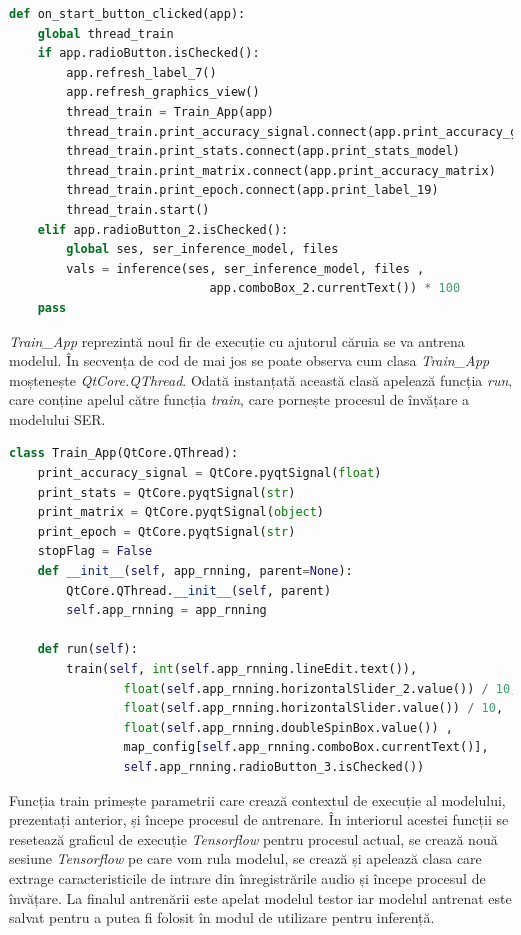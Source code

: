 \documentclass[a4paper,12pt]{book}
\begin{document}
		\begin{lstlisting}[language=Python, caption={Metoda interfetei grafice apelata automat in urma apasarii butonului Start.}, label=on_click]	
def on_start_button_clicked(app):
	global thread_train
	if app.radioButton.isChecked():
		app.refresh_label_7()
		app.refresh_graphics_view()
		thread_train = Train_App(app)
		thread_train.print_accuracy_signal.connect(app.print_accuracy_graph)
		thread_train.print_stats.connect(app.print_stats_model)
		thread_train.print_matrix.connect(app.print_accuracy_matrix)
		thread_train.print_epoch.connect(app.print_label_19)
		thread_train.start()
	elif app.radioButton_2.isChecked():
		global ses, ser_inference_model, files
		vals = inference(ses, ser_inference_model, files ,
							app.comboBox_2.currentText()) * 100
	pass \end{lstlisting}
		\textit{Train\_App} reprezintă noul fir de execuție cu ajutorul căruia se va antrena modelul. În secvența de cod de mai jos se poate observa cum clasa \textit{Train\_App} moștenește \textit{QtCore.QThread}. Odată instanțată această clasă apelează funcția \textit{run}, care conține apelul către funcția \textit{train}, care pornește procesul de învățare a modelului SER.
		\begin{lstlisting}[language=Python, caption={Clasa aferenta firului de executie pentru procesul de antrenare.}]	
class Train_App(QtCore.QThread):
	print_accuracy_signal = QtCore.pyqtSignal(float)
	print_stats = QtCore.pyqtSignal(str)
	print_matrix = QtCore.pyqtSignal(object)
	print_epoch = QtCore.pyqtSignal(str)
	stopFlag = False
	def __init__(self, app_rnning, parent=None):
		QtCore.QThread.__init__(self, parent)
		self.app_rnning = app_rnning
		
	def run(self):
		train(self, int(self.app_rnning.lineEdit.text()),
				float(self.app_rnning.horizontalSlider_2.value()) / 10,  
				float(self.app_rnning.horizontalSlider.value()) / 10, 
				float(self.app_rnning.doubleSpinBox.value()) ,
				map_config[self.app_rnning.comboBox.currentText()], 
				self.app_rnning.radioButton_3.isChecked()) \end{lstlisting}
		Funcția train primește parametrii care crează contextul de execuție al modelului, prezentați anterior, și începe procesul de antrenare. În interiorul acestei funcții se resetează graficul de execuție \textit{Tensorflow} pentru procesul actual, se crează nouă sesiune \textit{Tensorflow}  pe care vom rula modelul, se crează și apelează clasa care extrage caracteristicile de intrare din înregistrările audio și începe procesul de învățare. La finalul antrenării este apelat modelul testor iar modelul antrenat este salvat pentru a putea fi folosit în modul de utilizare pentru inferență. \par
		
\end{document}
